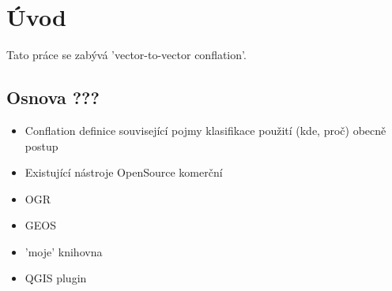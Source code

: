 \chapter{Úvod}
\label{1-uvod}

Tato práce se zabývá 'vector-to-vector conflation'.

\section{Osnova ???}

\begin{itemize}
 \item Conflation
  \subitem definice
  \subitem související pojmy
  \subitem klasifikace
  \subitem použití (kde, proč)
  \subitem obecně postup
 \item Existující nástroje
  \subitem OpenSource
  \subitem komerční
 \item OGR
 \item GEOS
 \item 'moje' knihovna
 \item QGIS
  \subitem plugin
\end{itemize}




